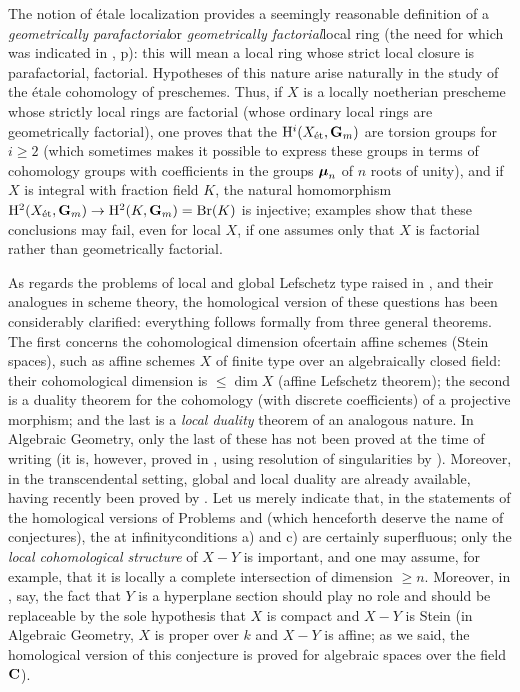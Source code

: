 \label{commpara}%
The notion of \'etale localization provides a seemingly reasonable definition of a \og \emph{geometrically parafactorial}\fg or \og \emph{geometrically factorial}\fg local ring\sisi{,}{} (the need for which was indicated in \numero{}, p\ptbl{}): this will mean a local ring whose strict local closure is parafactorial, \resp factorial. Hypotheses of this nature arise naturally in the study of the \'etale cohomology of preschemes. Thus, if $X$ is a locally noetherian prescheme whose strictly local rings are factorial (\ie whose ordinary local rings are \og geometrically factorial\fg), one proves that the $\mathrm H^i(X_{\textup{\'et}},\mathbf G_m)$ are torsion groups for $i\geq 2$ (which sometimes makes it possible to express these groups in terms of cohomology groups with coefficients in the groups $\boldsymbol{\mu}_n$ of $n$ roots of unity), and if $X$ is integral with fraction field $K$, the natural homomorphism $\mathrm H^2(X_{\textup{\'et}},\mathbf G_m)\to\mathrm H^2(K,\mathbf G_m)=\operatorname{Br}(K)$ is injective; examples show that these conclusions may fail, even for local $X$, if one assumes only that $X$ is factorial rather than geometrically factorial.

As regards the problems of local and global Lefschetz type raised in , and their analogues in scheme theory, the homological version of these questions has been considerably clarified: everything follows formally from three general theorems. The first concerns the cohomological dimension of\pageoriginale certain affine schemes (\resp Stein spaces), such as affine schemes $X$ of finite type over an algebraically closed field: their cohomological dimension is $\leq\dim X$ (\og affine Lefschetz theorem\fg); the second is a duality theorem for the cohomology (with discrete coefficients) of a projective morphism; and the last is a \emph{local duality} theorem of an analogous nature. In Algebraic Geometry, only the last of these has not been proved at the time of writing (it is, however, proved in , using resolution of singularities by ). Moreover, in the transcendental setting, global and local duality are already available, having recently been proved by . Let us merely indicate that, in the statements of the homological versions of Problems  and  (which henceforth deserve the name of conjectures), the \og at infinity\fg conditions a) and c) are certainly superfluous; only the \emph{local cohomological structure} of $X-Y$ is important, and one may assume, for example, that it is locally a complete intersection of dimension $\geq n$. Moreover, in , say, the fact that $Y$ is a hyperplane section should play no role and should be replaceable by the sole hypothesis that $X$ is compact and $X-Y$ is Stein (\ie in Algebraic Geometry, $X$ is proper over $k$ and $X-Y$ is affine; as we said, the homological version of this conjecture is proved for algebraic spaces over the field $\mathbf C$).

